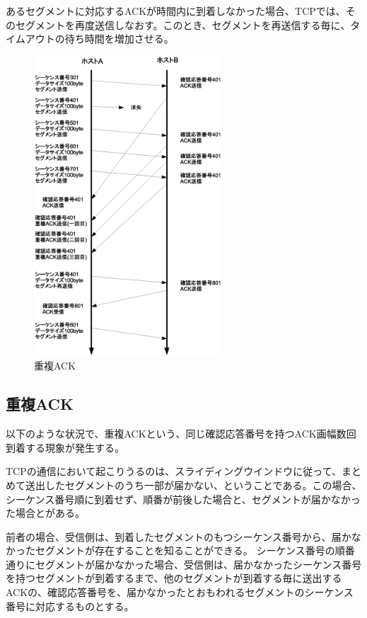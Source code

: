 あるセグメントに対応するACKが時間内に到着しなかった場合、TCPでは、そのセグメントを再度送信しなおす。このとき、セグメントを再送信する毎に、タイムアウトの待ち時間を増加させる。

\begin{figure}
	\includegraphics[width=7cm, clip]{draw/tcp08n.eps}
	\caption{重複ACK}
	\label{fig:tcp08}
\end{figure}

\subsection{重複ACK}

以下のような状況で、重複ACKという、同じ確認応答番号を持つACK画幅数回到着する現象が発生する。



TCPの通信において起こりうるのは、スライディングウインドウに従って、まとめて送出したセグメントのうち一部が届かない、ということである。この場合、シーケンス番号順に到着せず、順番が前後した場合と、セグメントが届かなかった場合とがある。

前者の場合、受信側は、到着したセグメントのもつシーケンス番号から、届かなかったセグメントが存在することを知ることができる。
シーケンス番号の順番通りにセグメントが届かなかった場合、受信側は、届かなかったシーケンス番号を持つセグメントが到着するまで、他のセグメントが到着する毎に送出するACKの、確認応答番号を、届かなかったとおもわれるセグメントのシーケンス番号に対応するものとする。

